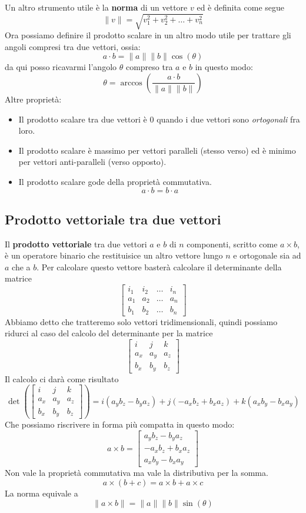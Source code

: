 Un altro strumento utile \`e la \textbf{norma} di un vettore $v$ ed \`e definita come segue
\[ \| v \| = \sqrt{v_1^2 + v_2^2 + \dots + v_n^2} \]
Ora possiamo definire il prodotto scalare in un altro modo utile per trattare gli angoli compresi tra due vettori, ossia:
\[ a \cdot b = \| a \| \| b \| \cos{(\theta)} \]
da qui posso ricavarmi l'angolo $\theta$ compreso tra $a$ e $b$ in questo modo:
\[ \theta = \arccos{\left( \frac{a \cdot b}{\| a \| \| b \|} \right)} \]
Altre propriet\`a:
\begin{itemize}
	\item Il prodotto scalare tra due vettori \`e 0 quando i due vettori sono \emph{ortogonali}
	      fra loro.
	\item Il prodotto scalare \`e massimo per vettori paralleli (stesso verso) ed \`e minimo
	      per vettori anti-paralleli (verso opposto).
	\item Il prodotto scalare gode della propriet\`a commutativa.
	      \[ a \cdot b = b \cdot a \]
\end{itemize}

\subsection{Prodotto vettoriale tra due vettori}
Il \textbf{prodotto vettoriale} tra due vettori $a$ e $b$ di $n$ componenti, scritto come $a \times b$, \`e un operatore
binario che restituisice un altro vettore lungo $n$ e ortogonale sia ad $a$ che a $b$. Per calcolare questo vettore
baster\`a calcolare il determinante della matrice
\[
	\begin{bmatrix}
		i_1 & i_2 & \dots & i_n \\
		a_1 & a_2 & \dots & a_n \\
		b_1 & b_2 & \dots & b_n
	\end{bmatrix}
\]
Abbiamo detto che tratteremo solo vettori tridimensionali, quindi possiamo ridurci al caso del calcolo del determinante
per la matrice
\[
	\begin{bmatrix}
		i   & j   & k   \\
		a_x & a_y & a_z \\
		b_x & b_y & b_z
	\end{bmatrix}
\]
Il calcolo ci dar\`a come risultato
\[
	\det{
		\left(
		\begin{bmatrix}
			i   & j   & k   \\
			a_x & a_y & a_z \\
			b_x & b_y & b_z
		\end{bmatrix}
		\right)
	} = i(a_y b_z - b_y a_z) + j(-a_x b_z + b_x a_z) + k(a_x b_y - b_x a_y)
\]
Che possiamo riscrivere in forma pi\`u compatta in questo modo:
\[
	a \times b = \begin{bmatrix}
		a_y b_z - b_y a_z \\ -a_x b_z + b_x a_z \\ a_x b_y - b_x a_y
	\end{bmatrix}
\]
Non vale la propriet\`a commutativa ma vale la distributiva per la somma.
\[ a \times (b + c) = a \times b + a \times c \]
La norma equivale a
\[ \| a \times b \| = \| a \| \| b \| \sin(\theta) \]

